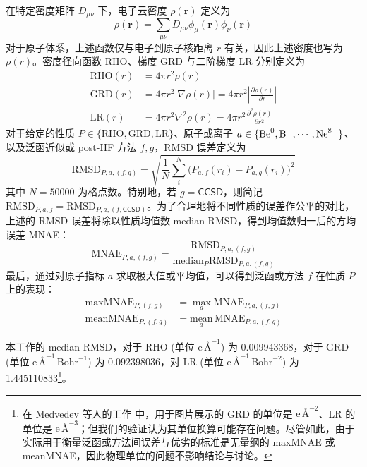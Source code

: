 在特定密度矩阵 $D_{\mu \nu}$ 下，电子云密度 $\rho(\bm{r})$ 定义为
\begin{equation}
    \rho(\bm{r}) = \sum_{\mu \nu} D_{\mu \nu} \phi_{\mu} (\bm{r}) \phi_{\nu} (\bm{r})
\end{equation}
对于原子体系，上述函数仅与电子到原子核距离 $r$ 有关，因此上述密度也写为 $\rho(r)$。密度径向函数 RHO、梯度 GRD 与二阶梯度 LR 分别定义为
\begin{align}
    \text{RHO}(r) &= 4 \pi r^2 \rho(r) \\
    \text{GRD}(r) &= 4 \pi r^2 | \nabla \rho(r) | = 4 \pi r^2 \left| \frac{\partial \rho(r)}{\partial r} \right| \\
    \text{LR}(r) &= 4 \pi r^2 \nabla^2 \rho(r) = 4 \pi r^2 \frac{\partial^2 \rho(r)}{\partial r^2}
\end{align}
对于给定的性质 $P \in \{\text{RHO}, \text{GRD}, \text{LR}\}$、原子或离子 $a \in \{\ce{Be^0}, \ce{B^+}, \cdots, \ce{Ne^8+}\}$、以及泛函近似或 post-HF 方法 $f, g$，RMSD 误差定义为
\begin{equation}
    \text{RMSD}_{P, a, (f, g)} = \sqrt{\frac{1}{N} \sum_i^N \big(P_{a, f} (r_i) - P_{a, g} (r_i) \big)^2}
\end{equation}
其中 $N = 50000$ 为格点数。特别地，若 $g = \textsf{CCSD}$，则简记 $\text{RMSD}_{P, a, f} = \text{RMSD}_{P, a, (f, \textsf{CCSD})}$。为了合理地将不同性质的误差作公平的对比，上述的 RMSD 误差将除以性质均值数 median RMSD，得到均值数归一后的方均误差 MNAE：
\begin{equation}
    \text{MNAE}_{P, a, (f, g)} = \frac{\text{RMSD}_{P, a, (f, g)}}{\text{median}_{P} \text{RMSD}_{P, a, (f, g)}}
\end{equation}
最后，通过对原子指标 $a$ 求取极大值或平均值，可以得到泛函或方法 $f$ 在性质 $P$ 上的表现：
\begin{align}
    \text{maxMNAE}_{P, (f, g)} &= \max_a \text{MNAE}_{P, a, (f, g)} \\
    \text{meanMNAE}_{P, (f, g)} &= \underset{a}{\text{mean}} \, \text{MNAE}_{P, a, (f, g)}
\end{align}

本工作的 median RMSD，对于 RHO (单位 $\text{e} \, \text{\AA}^{-1}$) 为 0.009943368，对于 GRD (单位 $\text{e} \, \text{\AA}^{-1} \, \text{Bohr}^{-1}$) 为 0.092398036，对 LR (单位 $\text{e} \, \text{\AA}^{-1} \, \text{Bohr}^{-2}$) 为 1.445110833\footnote{在 Medvedev 等人的工作\cite{Medvedev-Lyssenko.S.2017} 中，用于图片展示的 GRD 的单位是 $\text{e} \, \text{\AA}^{-2}$、LR 的单位是 $\text{e} \, \text{\AA}^{-3}$；但我们的验证认为其单位换算可能存在问题。尽管如此，由于实际用于衡量泛函或方法间误差与优劣的标准是无量纲的 maxMNAE 或 meanMNAE，因此物理单位的问题不影响结论与讨论。}。


